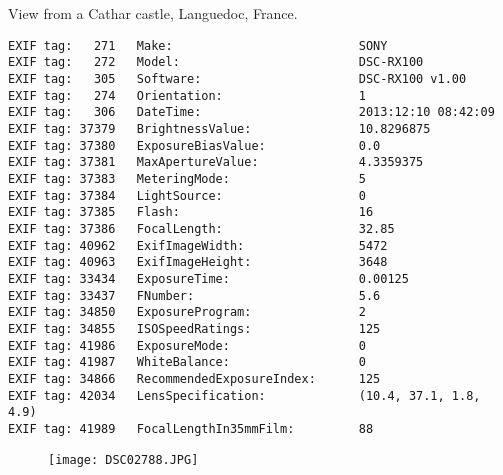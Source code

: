 \section{\protect{}}
\noindent View from a Cathar castle, Languedoc, France.
\noindent
\begin{lstlisting}
EXIF tag:   271   Make:                          SONY
EXIF tag:   272   Model:                         DSC-RX100
EXIF tag:   305   Software:                      DSC-RX100 v1.00
EXIF tag:   274   Orientation:                   1
EXIF tag:   306   DateTime:                      2013:12:10 08:42:09
EXIF tag: 37379   BrightnessValue:               10.8296875
EXIF tag: 37380   ExposureBiasValue:             0.0
EXIF tag: 37381   MaxApertureValue:              4.3359375
EXIF tag: 37383   MeteringMode:                  5
EXIF tag: 37384   LightSource:                   0
EXIF tag: 37385   Flash:                         16
EXIF tag: 37386   FocalLength:                   32.85
EXIF tag: 40962   ExifImageWidth:                5472
EXIF tag: 40963   ExifImageHeight:               3648
EXIF tag: 33434   ExposureTime:                  0.00125
EXIF tag: 33437   FNumber:                       5.6
EXIF tag: 34850   ExposureProgram:               2
EXIF tag: 34855   ISOSpeedRatings:               125
EXIF tag: 41986   ExposureMode:                  0
EXIF tag: 41987   WhiteBalance:                  0
EXIF tag: 34866   RecommendedExposureIndex:      125
EXIF tag: 42034   LensSpecification:             (10.4, 37.1, 1.8, 4.9)
EXIF tag: 41989   FocalLengthIn35mmFilm:         88

\end{lstlisting}
\clearpage
\begin{figure}
\raggedleft
\texttt{[image: DSC02788.JPG]}
\end{figure}


\clearpage
